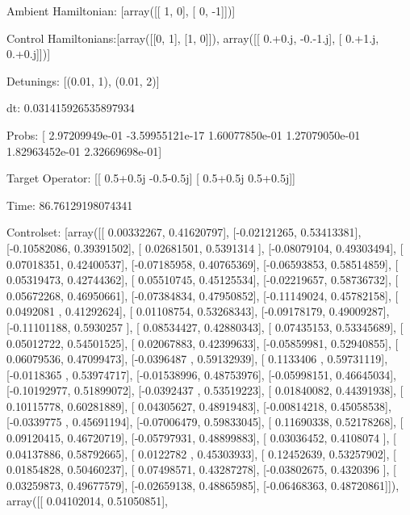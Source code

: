 \documentclass{article}
\begin{document}
    

\newpage

Ambient Hamiltonian: [array([[ 1,  0],
       [ 0, -1]])]

Control Hamiltonians:[array([[0, 1],
       [1, 0]]), array([[ 0.+0.j, -0.-1.j],
       [ 0.+1.j,  0.+0.j]])]

Detunings: [(0.01, 1), (0.01, 2)]

 dt: 0.031415926535897934

Probs: [  2.97209949e-01  -3.59955121e-17   1.60077850e-01   1.27079050e-01
   1.82963452e-01   2.32669698e-01]

Target Operator: [[ 0.5+0.5j -0.5-0.5j]
 [ 0.5+0.5j  0.5+0.5j]]

Time: 86.76129198074341

Controlset: [array([[ 0.00332267,  0.41620797],
       [-0.02121265,  0.53413381],
       [-0.10582086,  0.39391502],
       [ 0.02681501,  0.5391314 ],
       [-0.08079104,  0.49303494],
       [ 0.07018351,  0.42400537],
       [-0.07185958,  0.40765369],
       [-0.06593853,  0.58514859],
       [ 0.05319473,  0.42744362],
       [ 0.05510745,  0.45125534],
       [-0.02219657,  0.58736732],
       [ 0.05672268,  0.46950661],
       [-0.07384834,  0.47950852],
       [-0.11149024,  0.45782158],
       [ 0.0492081 ,  0.41292624],
       [ 0.01108754,  0.53268343],
       [-0.09178179,  0.49009287],
       [-0.11101188,  0.5930257 ],
       [ 0.08534427,  0.42880343],
       [ 0.07435153,  0.53345689],
       [ 0.05012722,  0.54501525],
       [ 0.02067883,  0.42399633],
       [-0.05859981,  0.52940855],
       [ 0.06079536,  0.47099473],
       [-0.0396487 ,  0.59132939],
       [ 0.1133406 ,  0.59731119],
       [-0.0118365 ,  0.53974717],
       [-0.01538996,  0.48753976],
       [-0.05998151,  0.46645034],
       [-0.10192977,  0.51899072],
       [-0.0392437 ,  0.53519223],
       [ 0.01840082,  0.44391938],
       [ 0.10115778,  0.60281889],
       [ 0.04305627,  0.48919483],
       [-0.00814218,  0.45058538],
       [-0.0339775 ,  0.45691194],
       [-0.07006479,  0.59833045],
       [ 0.11690338,  0.52178268],
       [ 0.09120415,  0.46720719],
       [-0.05797931,  0.48899883],
       [ 0.03036452,  0.4108074 ],
       [ 0.04137886,  0.58792665],
       [ 0.0122782 ,  0.45303933],
       [ 0.12452639,  0.53257902],
       [ 0.01854828,  0.50460237],
       [ 0.07498571,  0.43287278],
       [-0.03802675,  0.4320396 ],
       [ 0.03259873,  0.49677579],
       [-0.02659138,  0.48865985],
       [-0.06468363,  0.48720861]]), array([[ 0.04102014,  0.51050851],
\end{document}
